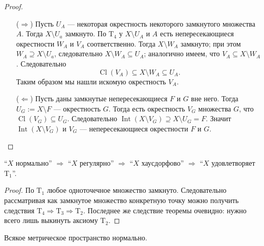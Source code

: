 \documentclass[12pt,a4paper]{article}
\DeclareMathOperator{\Int}{Int}
\DeclareMathOperator{\Cl}{Cl}
\newcommand{\T}{\ensuremath{\mathrm{T}}\xspace}
\begin{document}
    \begin{proof}
        \begin{itemize}
            \item[($\Rightarrow$)]
                Пусть $U_A$ --- некоторая окрестность некоторого замкнутого множества $A$. Тогда $X \setminus U_a$ замкнуто. По $\T_4$ у $X \setminus U_A$ и $A$ есть непересекающиеся окрестности $W_A$ и $V_A$ соответственно. Тогда $X \setminus W_A$ замкнуто; при этом $W_A \supseteq X \setminus U_a$, следовательно $X \setminus W_A \subseteq U_A$; аналогично имеем, что $V_A \subseteq X \setminus W_A$. Следовательно
                \[\Cl(V_A) \subseteq X \setminus W_A \subseteq U_A.\]
                Таким образом мы нашли искомую окрестность $V_A$.

            \item[($\Leftarrow$)]
                Пусть даны замкнутые непересекающиеся $F$ и $G$ вне него. Тогда $U_G := X \setminus F$ --- окрестность $G$. Тогда есть окрестность $V_G$ множества $G$, что $\Cl(V_G) \subseteq U_G$. Следовательно $\Int(X \setminus V_G) \supseteq X \setminus U_G = F$. Значит $\Int(X \setminus V_G)$ и $V_G$ --- непересекающиеся окрестности $F$ и $G$.
        \end{itemize}
    \end{proof}

    \begin{theorem}
        ``$X$ нормально'' $\Rightarrow$ ``$X$ регулярно'' $\Rightarrow$ ``$X$ хаусдорфово'' $\Rightarrow$ ``$X$ удовлетворяет $\T_1$''.
    \end{theorem}

    \begin{proof}
        По $\T_1$ любое одноточечное множество замкнуто. Следовательно рассматривая как замкнутое множество конкретную точку можно получить следствия $\T_4 \Rightarrow \T_3 \Rightarrow \T_2$. Последнее же следствие теоремы очевидно: нужно всего лишь выкинуть аксиому $\T_2$.
    \end{proof}

    \begin{theorem}
        Всякое метрическое пространство нормально.
    \end{theorem}
    
\end{document}
